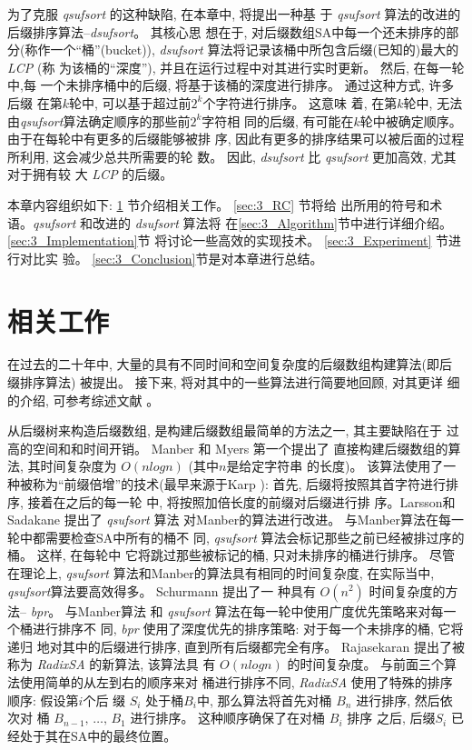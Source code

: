 为了克服 \emph{qsufsort} 的这种缺陷, 在本章中, 将提出一种基
于 \emph{qsufsort} 算法的改进的后缀排序算法--\emph{dsufsort}。 其核心思
想在于, 对后缀数组SA中每一个还未排序的部分(称作一个“桶”(bucket)),
\emph{dsufsort} 算法将记录该桶中所包含后缀(已知的)最大的\emph{LCP} (称
为该桶的“深度”), 并且在运行过程中对其进行实时更新。 然后, 在每一轮中,每
一个未排序桶中的后缀, 将基于该桶的深度进行排序。 通过这种方式, 许多后缀
在第$k$轮中, 可以基于超过前$2^k$个字符进行排序。 这意味
着, 在第$k$轮中, 无法由\emph{qsufsort}算法确定顺序的那些前$2^{k}$字符相
同的后缀, 有可能在$k$轮中被确定顺序。 由于在每轮中有更多的后缀能够被排
序, 因此有更多的排序结果可以被后面的过程所利用, 这会减少总共所需要的轮
数。 因此, \emph{dsufsort} 比 \emph{qsufsort} 更加高效, 尤其对于拥有较
大 \emph{LCP} 的后缀。

本章内容组织如下: \ref{sec:3_RW} 节介绍相关工作。 \ref{sec:3_RC} 节将给
出所用的符号和术语。\emph{qsufsort} 和改进的 \emph{dsufsort} 算法将
在\ref{sec:3_Algorithm}节中进行详细介绍。 \ref{sec:3_Implementation}节
将讨论一些高效的实现技术。 \ref{sec:3_Experiment} 节进行对比实
验。 \ref{sec:3_Conclusion}节是对本章进行总结。

\section{相关工作}
\label{sec:3_RW}


在过去的二十年中, 大量的具有不同时间和空间复杂度的后缀数组构建算法(即后
缀排序算法) 被提出。 接下来, 将对其中的一些算法进行简要地回顾, 对其更详
细的介绍, 可参考综述文献 \cite{Puglisi2007} \cite{Dhaliwal2012}。

从后缀树来构造后缀数组, 是构建后缀数组最简单的方法之一, 其主要缺陷在于
过高的空间和和时间开销。 Manber 和 Myers \cite{Manber1993} 第一个提出了
直接构建后缀数组的算法, 其时间复杂度为 $O(nlogn)$ (其中$n$是给定字符串
的长度)。 该算法使用了一种被称为“前缀倍增”的技术(最早来源于Karp
\cite{Karp1972}): 首先, 后缀将按照其首字符进行排序, 接着在之后的每一轮
中, 将按照加倍长度的前缀对后缀进行排
序。Larsson和Sadakane\cite{Larsson2007} 提出了 \emph{qsufsort} 算法
对Manber的算法进行改进。 与Manber算法在每一轮中都需要检查SA中所有的桶不
同, \emph{qsufsort} 算法会标记那些之前已经被排过序的桶。 这样, 在每轮中
它将跳过那些被标记的桶, 只对未排序的桶进行排序。 尽管在理论上,
\emph{qsufsort} 算法和Manber的算法具有相同的时间复杂度, 在实际当中,
\emph{qsufsort}算法要高效得多。 Schurmann\cite{Schurmann2007} 提出了一
种具有 $O(n^2)$ 时间复杂度的方法-- \emph{bpr}。 与Manber算法
和 \emph{qsufsort} 算法在每一轮中使用广度优先策略来对每一个桶进行排序不
同, \emph{bpr} 使用了深度优先的排序策略: 对于每一个未排序的桶, 它将递归
地对其中的后缀进行排序, 直到所有后缀都完全有序。  Rajasekaran
\cite{Rajasekaran2014} 提出了被称为 \emph{RadixSA} 的新算法, 该算法具
有 $O(nlogn)$ 的时间复杂度。 与前面三个算法使用简单的从左到右的顺序来对
桶进行排序不同, \emph{RadixSA} 使用了特殊的排序顺序: 假设第$i$个后
缀 $S_i$ 处于桶$B_i$中, 那么算法将首先对桶 $B_n$ 进行排序, 然后依次对
桶 $B_{n-1},\,\dots,\, B_1$ 进行排序。 这种顺序确保了在对桶 $B_i$ 排序
之后, 后缀$S_i$ 已经处于其在SA中的最终位置。

